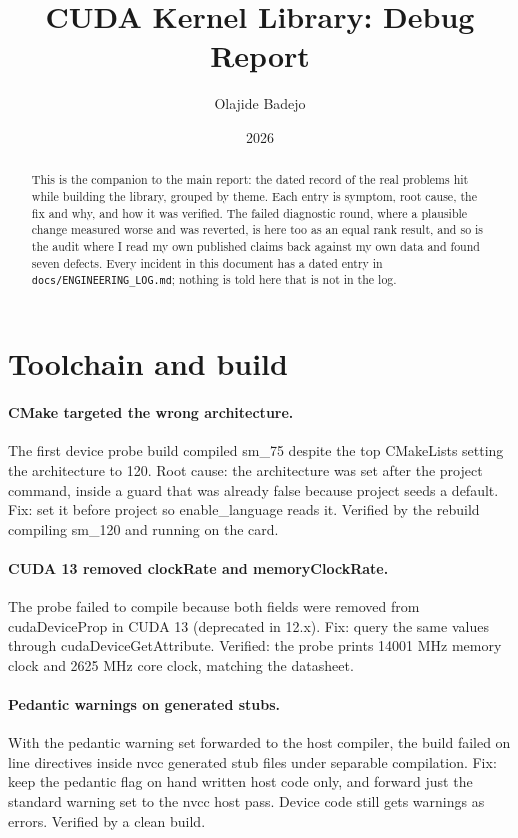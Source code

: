\documentclass[11pt]{article}
\title{CUDA Kernel Library: Debug Report}
\author{Olajide Badejo}
\date{2026}
\begin{document}
\maketitle

\begin{abstract}
This is the companion to the main report: the dated record of the real problems
hit while building the library, grouped by theme. Each entry is symptom, root
cause, the fix and why, and how it was verified. The failed diagnostic round, where
a plausible change measured worse and was reverted, is here too as an equal rank
result, and so is the audit where I read my own published claims back against my
own data and found seven defects. Every incident in this document has a dated
entry in \texttt{docs/ENGINEERING\_LOG.md}; nothing is told here that is not in the
log.
\end{abstract}

\newpage

\section{Toolchain and build}

\paragraph{CMake targeted the wrong architecture.} The first device probe build
compiled sm\_75 despite the top CMakeLists setting the architecture to 120. Root
cause: the architecture was set after the project command, inside a guard that was
already false because project seeds a default. Fix: set it before project so
enable\_language reads it. Verified by the rebuild compiling sm\_120 and running on
the card.

\paragraph{CUDA 13 removed clockRate and memoryClockRate.} The probe failed to
compile because both fields were removed from cudaDeviceProp in CUDA 13 (deprecated
in 12.x). Fix: query the same values through cudaDeviceGetAttribute. Verified: the
probe prints 14001 MHz memory clock and 2625 MHz core clock, matching the
datasheet.

\paragraph{Pedantic warnings on generated stubs.} With the pedantic warning set
forwarded to the host compiler, the build failed on line directives inside nvcc
generated stub files under separable compilation. Fix: keep the pedantic flag on
hand written host code only, and forward just the standard warning set to the nvcc
host pass. Device code still gets warnings as errors. Verified by a clean build.
\end{document}
